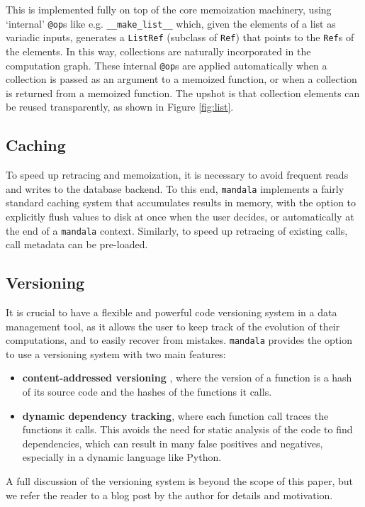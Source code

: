 \documentclass{article} %
\begin{document}
This is implemented fully on top of the core memoization machinery, using
`internal' \texttt{@op}s like e.g. \verb|__make_list__| which, given the
elements of a list as variadic inputs, generates a \texttt{ListRef} (subclass of
\texttt{Ref}) that points to the \texttt{Ref}s of the elements. In this way,
collections are naturally incorporated in the computation graph. These internal
\texttt{@op}s are applied automatically when a collection is passed as an
argument to a memoized function, or when a collection is returned from a
memoized function. The upshot is that collection elements can be reused
transparently, as shown in Figure \ref{fig:list}.

\subsection{Caching}
To speed up retracing and memoization, it is necessary to avoid frequent reads
and writes to the database backend. To this end, \texttt{mandala} implements a
fairly standard caching system that accumulates results in memory, with the
option to explicitly flush values to disk at once when the user decides, or
automatically at the end of a \texttt{mandala} context. Similarly, to speed up
retracing of existing calls, call metadata can be pre-loaded.

\subsection{Versioning}
\label{subsection:}

It is crucial to have a flexible and powerful code versioning system in a data
management tool, as it allows the user to keep track of the evolution of their
computations, and to easily recover from mistakes. \texttt{mandala} provides the
option to use a versioning system with two main features:
\begin{itemize}
\item \textbf{content-addressed versioning} \citep{git}, where the version of a
function is a hash of its source code and the hashes of the functions it calls.
\item \textbf{dynamic dependency tracking}, where each function call traces the
functions it calls. This avoids the need for static analysis of the code to find
dependencies, which can result in many false positives and negatives, especially
in a dynamic language like Python.
\end{itemize}

A full discussion of the versioning system is beyond the scope of this paper,
but we refer the reader to a blog post by the author
\citep{makelov2023practical} for details and motivation.
\end{document}
